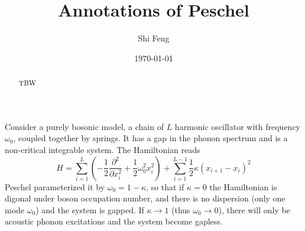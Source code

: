\documentclass[letterpaper,prb,superscriptaddress]{revtex4}
\theoremstyle{definition}
\begin{document}
\title{Annotations of Peschel}
\author{Shi Feng}

\date{\today}

\begin{abstract}
TBW
\end{abstract}

\maketitle


\section{}
Consider a purely bosonic model, a chain of $L$ harmonic oscillator with frequency  $\omega_0$, coupled together by springs. It has a gap in the phonon spectrum and is a non-critical integrable system. The Hamiltonian reads
\begin{equation}
	H = \sum_{i=1}^L \left( -\frac{1}{2} \frac{\partial ^2}{\partial x_i^2} + \frac{1}{2} \omega_0^2 x_i^2 \right)   + \sum_{i=1}^{L-1} \frac{1}{2}\kappa(x_{i+1} - x_i)^2 
\end{equation}
Peschel parameterized it by $\omega_0 = 1 - \kappa$, so that if $\kappa = 0$ the Hamiltonian is digonal under boson occupation number, and there is no dispersion (only one mode $\omega_0$) and the system is gapped. If $\kappa \rightarrow 1$ (thus $\omega_0 \rightarrow 0$), there will only be acoustic phonon excitations and the system become gapless.  
\end{document}
